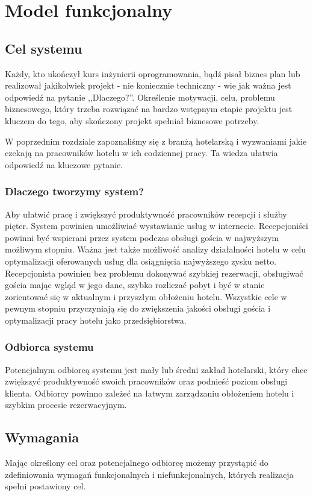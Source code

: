 \documentclass[a4paper,onecolumn,oneside,11pt,wide,floatssmall]{mwrep}
\theoremstyle{definition}
\theoremstyle{plain}%
\theoremstyle{remark}
\begin{document}
\chapter{Model funkcjonalny}
\label{wymagania}
\section{Cel systemu}
Każdy, kto ukończył kurs inżynierii oprogramowania, bądź pisał biznes plan lub realizował jakikolwiek projekt - nie koniecznie techniczny -  
 wie jak ważna jest odpowiedź na pytanie ,,Dlaczego?''. Określenie motywacji, celu, problemu biznesowego, który trzeba 
 rozwiązać na bardzo wstępnym etapie projektu jest kluczem do tego, aby skończony projekt spełniał biznesowe potrzeby.

W poprzednim rozdziale zapoznaliśmy się z branżą hotelarską i wyzwaniami jakie czekają na pracowników hotelu w ich 
codziennej pracy. Ta wiedza ułatwia odpowiedź na kluczowe pytanie.

\subsection{Dlaczego tworzymy system?}
Aby ułatwić pracę i zwiększyć produktywność pracowników recepcji i służby pięter. System powinien 
umożliwiać wystawianie usług w internecie. Recepcjoniści powinni być wspierani przez system podczas obsługi gościa w 
najwyższym możliwym stopniu. Ważna jest także możliwość analizy działalności hotelu w celu optymalizacji oferowanych 
usług dla osiągnięcia najwyższego zysku netto. Recepcjonista powinien bez problemu dokonywać szybkiej rezerwacji, 
obsługiwać gościa mając wgląd w jego dane, szybko rozliczać pobyt i być w stanie zorientować się w aktualnym i 
przyszłym obłożeniu hotelu. Wszystkie cele w pewnym stopniu przyczyniają się do zwiększenia jakości obsługi gościa i 
optymalizacji pracy hotelu jako przedsiębiorstwa.

\subsection{Odbiorca systemu}
Potencjalnym odbiorcą systemu jest mały lub średni zakład hotelarski, który chce zwiększyć produktywność swoich pracowników oraz podnieść poziom obsługi klienta. Odbiorcy powinno zależeć na łatwym zarządzaniu obłożeniem hotelu i szybkim procesie rezerwacyjnym.

\section{Wymagania}
Mając określony cel oraz potencjalnego odbiorcę możemy przystąpić do zdefiniowania wymagań funkcjonalnych i niefunkcjonalnych, których realizacja spełni postawiony cel.
\end{document}
